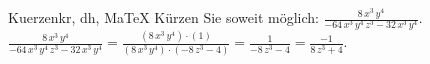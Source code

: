 \begin{MAufgabe}{Kuerzen}{kr, dh, MaTeX}
K\"urzen Sie soweit m\"oglich: $\frac{8\, x^3\, y^4}{ - 64\, x^3\, y^4\, z^3 - 32\, x^3\, y^4}$.\\ 
\ifLsg\MLoesung
\quad $\frac{8\, x^3\, y^4}{ - 64\, x^3\, y^4\, z^3 - 32\, x^3\, y^4}=\frac{(8\, x^3\, y^4)\cdot(1)}{(8\, x^3\, y^4)\cdot( - 8\, z^3 - 4)}=\frac{1}{ - 8\, z^3 - 4}=\frac{-1}{8\, z^3 + 4}$.\else\relax\fi
 \end{MAufgabe}